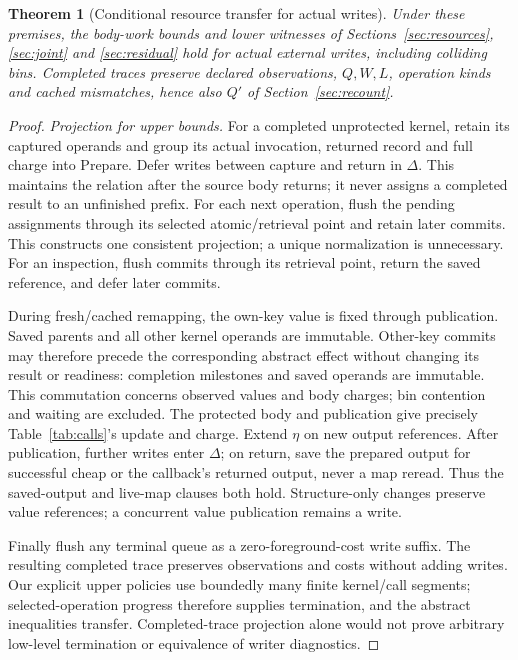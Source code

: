 \documentclass[acmsmall,screen,review,anonymous]{acmart}
\newtheorem{theorem}{Theorem}
\begin{document}
\begin{theorem}[Conditional resource transfer for actual writes]
\label{thm:writes}
Under these premises, the body-work bounds and lower witnesses of Sections~\ref{sec:resources}, \ref{sec:joint} and \ref{sec:residual} hold for actual external writes, including colliding bins. Completed traces preserve declared observations, $Q,W,L$, operation kinds and cached mismatches, hence also $Q'$ of Section~\ref{sec:recount}.
\end{theorem}
\begin{proof}
\emph{Projection for upper bounds.} For a completed unprotected kernel, retain its captured operands and group its actual invocation, returned record and full charge into Prepare. Defer writes between capture and return in $\Delta$. This maintains the relation after the source body returns; it never assigns a completed result to an unfinished prefix. For each next operation, flush the pending assignments through its selected atomic/retrieval point and retain later commits. This constructs one consistent projection; a unique normalization is unnecessary. For an inspection, flush commits through its retrieval point, return the saved reference, and defer later commits.

During fresh/cached remapping, the own-key value is fixed through publication. Saved parents and all other kernel operands are immutable. Other-key commits may therefore precede the corresponding abstract effect without changing its result or readiness: completion milestones and saved operands are immutable. This commutation concerns observed values and body charges; bin contention and waiting are excluded. The protected body and publication give precisely Table~\ref{tab:calls}'s update and charge. Extend $\eta$ on new output references. After publication, further writes enter $\Delta$; on return, save the prepared output for successful cheap or the callback's returned output, never a map reread. Thus the saved-output and live-map clauses both hold. Structure-only changes preserve value references; a concurrent value publication remains a write.

Finally flush any terminal queue as a zero-foreground-cost write suffix. The resulting completed trace preserves observations and costs without adding writes. Our explicit upper policies use boundedly many finite kernel/call segments; selected-operation progress therefore supplies termination, and the abstract inequalities transfer. Completed-trace projection alone would not prove arbitrary low-level termination or equivalence of writer diagnostics.


\end{proof}
\end{document}

